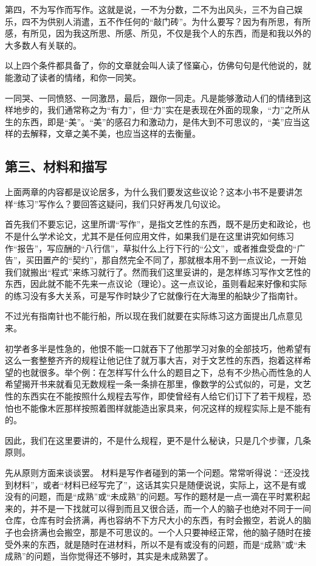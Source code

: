 \documentclass[fontset=fandol,12pt,a5paper]{ctexbook}
\begin{document}
第四，不为写作而写作。这就是说，一不为分数，二不为出风头，三不为自己娱乐，四不为供别人消遣，五不作任何的“敲门砖”。为什么要写？因为有所思，有所感，有所见，因为我这所思、所感、所见，不仅是我个人的东西，而是和我以外的大多数人有关联的。

以上四个条件都具备了，你的文章就会叫人读了怪窼心，仿佛句句是代他说的，就能激动了读者的情绪，和你一同笑。

一同哭、一同愤怒、一同激昂，最后，跟你一同走。凡是能够激动人们的情绪到这样地步的，我们通常称之为“有力”，但“力”实在是表现在外面的现象，“力”之所从生的东西，即是“美”。“美”的感召力和激动力，是伟大到不可思议的，“美”应当这样的去解释，文章之美不美，也应当这样的去衡量。

\subsection{第三、材料和描写}
上面两章的内容都是议论居多，为什么我们要发这些议论？这本小书不是要讲怎样“练习”写作么？要回答这疑问，我们只好再发几句议论。

首先我们不要忘记，这里所谓“写作”，是指文艺性的东西，既不是历史和政论，也不是什么学术论文，尤其不是任何应用文件，如果我们是在这里讲究如何练习作“报告”，写应酬的“八行信”，草拟什么上行下行的“公文”，或者推盘受盘的“广告”，买田置产的“契约”，那自然完全不同了，那就根本用不到一点议论，一开始我们就搬出“程式”来练习就行了。然而我们这里妥讲的，是怎样练习写作文艺性的东西，因此就不能不先来一点议论（理论）。这一点议论，虽则看起来好像和实际的练习没有多大关系，可是写作时缺少了它就像行在大海里的船缺少了指南针。

不过光有指南针也不能行船，所以现在我们就要在实际练习这方面提出几点意见来。

初学者多半是性急的，他恨不能一口就吞下了他那学习对象的全部技巧，他希望有这么一套整整齐齐的规程让他记住了就万事大吉，对于文艺性的东西，抱着这样希望的也就很多。举个例：在怎样写什么什么的题目之下，总有不少热心而性急的人希望揭开书来就看见无数规程一条一条排在那里，像数学的公式似的，可是，文艺性的东西实在不能按照什么规程去写作，即使曾经有人给它们订下了若干规程，恐怕也不能像木匠那样按照着图样就能造出家具来，何况这样的规程实际上是不能有的。

因此，我们在这里要讲的，不是什么规程，更不是什么秘诀，只是几个步骤，几条原则。

先从原则方面来谈谈罢。
材料是写作者碰到的第一个问题。常常听得说：“还没找到材料”，或者“材料已经写完了”，这话其实只是随便说说，实际上，这不是有或没有的问题，而是“成熟”或“未成熟”的问题。写作的题材是一点一滴在平时累积起来的，并不是一下找就可以得到而且又很合适，而一个人的脑子也绝对不同于一间仓库，仓库有时会挤满，再也容纳不下方尺大小的东西，有时会搬空，若说人的脑子也会挤满也会搬空，那是不可思议的。一个人只要神经正常，他的脑子随时在接受外来的东西，就是随时在进材料，所以不是有或没有的问题，而是“成熟”或“未成熟”的问题，当你觉得还不够时，其实是未成熟罢了。
\end{document}
